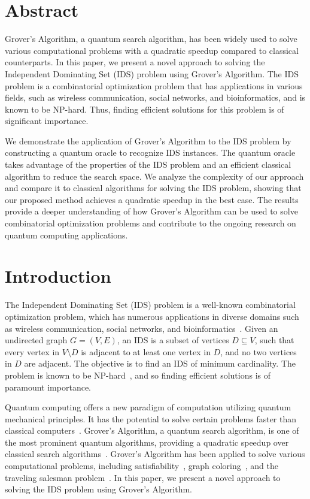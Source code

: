 \section{Abstract}
Grover's Algorithm, a quantum search algorithm, has been widely used to solve various computational problems with a quadratic speedup compared to classical counterparts. In this paper, we present a novel approach to solving the Independent Dominating Set (IDS) problem using Grover's Algorithm. The IDS problem is a combinatorial optimization problem that has applications in various fields, such as wireless communication, social networks, and bioinformatics, and is known to be NP-hard. Thus, finding efficient solutions for this problem is of significant importance.

We demonstrate the application of Grover's Algorithm to the IDS problem by constructing a quantum oracle to recognize IDS instances. The quantum oracle takes advantage of the properties of the IDS problem and an efficient classical algorithm to reduce the search space. We analyze the complexity of our approach and compare it to classical algorithms for solving the IDS problem, showing that our proposed method achieves a quadratic speedup in the best case. The results provide a deeper understanding of how Grover's Algorithm can be used to solve combinatorial optimization problems and contribute to the ongoing research on quantum computing applications.

\section{Introduction}
The Independent Dominating Set (IDS) problem is a well-known combinatorial optimization problem, which has numerous applications in diverse domains such as wireless communication, social networks, and bioinformatics~\cite{IDS_applications}. Given an undirected graph $G=(V,E)$, an IDS is a subset of vertices $D \subseteq V$, such that every vertex in $V \setminus D$ is adjacent to at least one vertex in $D$, and no two vertices in $D$ are adjacent. The objective is to find an IDS of minimum cardinality. The problem is known to be NP-hard~\cite{garey1979computers}, and so finding efficient solutions is of paramount importance.

Quantum computing offers a new paradigm of computation utilizing quantum mechanical principles. It has the potential to solve certain problems faster than classical computers~\cite{nielsen2002quantum}. Grover's Algorithm, a quantum search algorithm, is one of the most prominent quantum algorithms, providing a quadratic speedup over classical search algorithms~\cite{grover1996fast}. Grover's Algorithm has been applied to solve various computational problems, including satisfiability~\cite{grover1997quantum}, graph coloring~\cite{childs2002quantum}, and the traveling salesman problem~\cite{zalka1999solving}. In this paper, we present a novel approach to solving the IDS problem using Grover's Algorithm.

